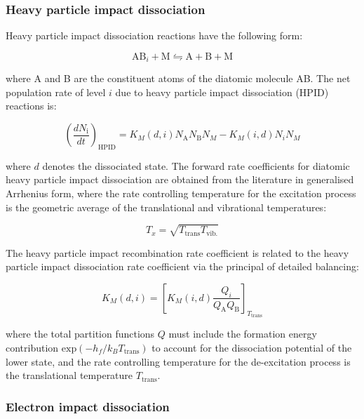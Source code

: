 \subsubsection{Heavy particle impact dissociation}

Heavy particle impact dissociation reactions have the following form:

\begin{equation}
 \text{AB}_i + \text{M} \leftrightharpoons  \text{A} + \text{B} + \text{M}
\end{equation}

\noindent where A and B are the constituent atoms of the diatomic molecule AB.
The net population rate of level $i$ due to heavy particle impact dissociation (HPID) reactions is:

\begin{equation}
 \left ( \frac{dN_\text{i}}{dt} \right )_\text{HPID} =  K_{M}(d,i) N_\text{A} N_\text{B} N_{M} - K_{M} (i,d) N_{i} N_{M} 
\end{equation}

\noindent where $d$ denotes the dissociated state.
The forward rate coefficients for diatomic heavy particle impact dissociation are obtained from the literature in generalised Arrhenius form, where the rate controlling temperature for the excitation process is the geometric average of the translational and vibrational temperatures:

\begin{equation}
 T_x = \sqrt{T_\text{trans} T_\text{vib.}}
\end{equation}

The heavy particle impact recombination rate coefficient is related to the heavy particle impact dissociation rate coefficient via the principal of detailed balancing:

\begin{equation}
 K_{M}(d,i) = \left [ K_{M}(i,d) \frac{Q_i}{Q_\text{A} Q_\text{B}} \right ]_{T_\text{trans}}
\end{equation}

\noindent where the total partition functions $Q$ must include the formation energy contribution $\text{exp} \left ( - h_f / k_B T_\text{trans} \right )$ to account for the dissociation potential of the lower state, and the rate controlling temperature for the de-excitation process is the translational temperature $T_\text{trans}$. 

\subsubsection{Electron impact dissociation}

